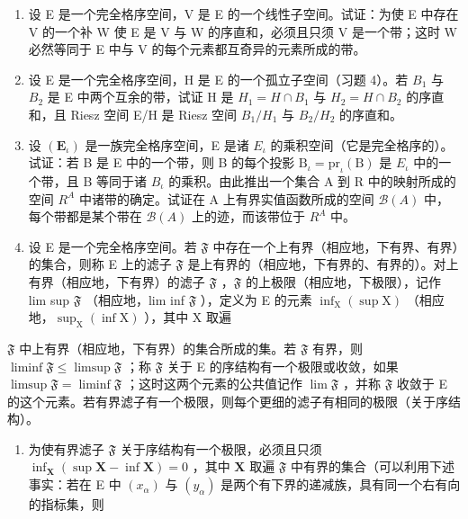 \begin{enumerate}
\def\labelenumi{\arabic{enumi})}
\setcounter{enumi}{5}
\item
  设 E 是一个完全格序空间，V 是 E 的一个线性子空间。试证：为使 E 中存在 V 的一个补 W 使 E 是 V 与 W 的序直和，必须且只须 V 是一个带；这时 W 必然等同于 E 中与 V 的每个元素都互奇异的元素所成的带。
\item
  设 E 是一个完全格序空间，H 是 E 的一个孤立子空间（习题 4）。若 \(B_{1}\) 与 \(B_{2}\) 是 E 中两个互余的带，试证 H 是 \(H_{1}=H\cap B_{1}\) 与 \(H_{2}=H\cap B_{2}\) 的序直和，且 Riesz 空间 E/H 是 Riesz 空间 \(B_{1}/H_{1}\) 与 \(B_{2}/H_{2}\) 的序直和。
\item
  设 \((\mathbf{E}_{\iota})\) 是一族完全格序空间，E 是诸 \(E_{\iota}\) 的乘积空间（它是完全格序的）。试证：若 B 是 E 中的一个带，则 B 的每个投影 \(\mathrm{B}_{\iota} = \mathrm{pr}_{\iota}(\mathrm{B})\) 是 \(E_{\iota}\) 中的一个带，且 B 等同于诸 \(B_{\iota}\) 的乘积。由此推出一个集合 A 到 R 中的映射所成的空间 \(R^{A}\) 中诸带的确定。试证在 A 上有界实值函数所成的空间 \(\mathcal{B}(A)\) 中，每个带都是某个带在 \(\mathcal{B}(A)\) 上的迹，而该带位于 \(R^{A}\) 中。
\item
  设 E 是一个完全格序空间。若 \(\mathfrak{F}\) 中存在一个上有界（相应地，下有界、有界）的集合，则称 E 上的滤子 \(\mathfrak{F}\) 是上有界的（相应地，下有界的、有界的）。对上有界（相应地，下有界）的滤子 \(\mathfrak{F}\) ，\(\mathfrak{F}\) 的上极限（相应地，下极限），记作 lim sup \(\mathfrak{F}\) （相应地，lim inf \(\mathfrak{F}\) ），定义为 E 的元素 \(\inf_{\mathrm{X}}(\sup \mathrm{X})\) （相应地，\(\sup_{\mathrm{X}}(\inf \mathrm{X})\) ），其中 X 取遍
\end{enumerate}

\(\mathfrak{F}\) 中上有界（相应地，下有界）的集合所成的集。若 \(\mathfrak{F}\) 有界，则 \(\liminf\mathfrak{F} \leqslant \limsup\mathfrak{F}\) ；称 \(\mathfrak{F}\) 关于 E 的序结构有一个极限或收敛，如果 \(\limsup\mathfrak{F} = \liminf\mathfrak{F}\) ；这时这两个元素的公共值记作 \(\lim\mathfrak{F}\) ，并称 \(\mathfrak{F}\) 收敛于 E 的这个元素。若有界滤子有一个极限，则每个更细的滤子有相同的极限（关于序结构）。

\begin{enumerate}
\def\labelenumi{\alph{enumi})}
\tightlist
\item
  为使有界滤子 \(\mathfrak{F}\) 关于序结构有一个极限，必须且只须 \(\inf_{\mathbf{X}} (\sup \mathbf{X} - \inf \mathbf{X}) = 0\) ，其中 \(\mathbf{X}\) 取遍 \(\mathfrak{F}\) 中有界的集合（可以利用下述事实：若在 E 中 \((x_{\alpha})\) 与 \((y_{\alpha})\) 是两个有下界的递减族，具有同一个右有向的指标集，则
\end{enumerate}

